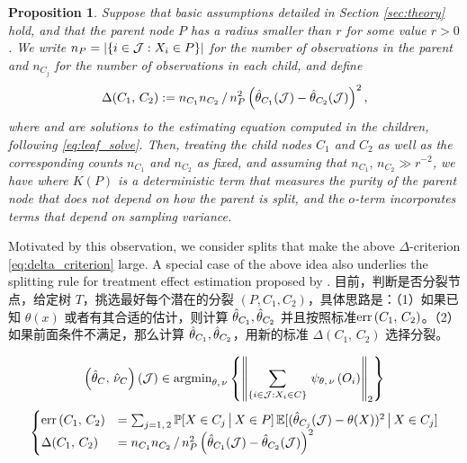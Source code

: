 \documentclass[aos]{imsart}
\theoremstyle{plain}
\newtheorem{prop}{Proposition}
\theoremstyle{definition}
\theoremstyle{remark}
\begin{document}
\begin{CJK}{UTF8}{gbsn}
\begin{prop}
\label{prop:motivation}
Suppose that basic assumptions detailed in Section \ref{sec:theory} hold,
and that the parent node $P$ has a radius smaller than
$r$ for some value $r > 0$. We write $n_P = \left\lvert\left\{i\in\mathcal{J} : X_i \in P\right\}\right\rvert$ for the number of
observations in the parent and $n_{C_j}$ for the number of observations in each child, and define
\begin{equation}
\label{eq:delta_criterion}
\Delta(C_1, \, C_2) := {n_{C_1} n_{C_2}}\,/\,{n_P^2}  \p{\htheta_{C_1}(\mathcal{J}) - \htheta_{C_2}(\mathcal{J})}^2,
\end{equation}
where  and  are solutions to the
estimating equation computed in the children, following \eqref{eq:leaf_solve}.
Then, treating the child nodes $C_1$ and $C_2$ as well as the corresponding counts $n_{C_1}$ and $n_{C_2}$
as fixed, and assuming that $n_{C_1}, \, n_{C_2} \gg r^{-2}$, we have
where $K(P)$ is a deterministic term that measures the purity of the parent node that does not depend on how the parent is split, and the $o$-term incorporates terms that depend on
sampling variance.
\end{prop}

Motivated by this observation, we consider splits that make the above $\Delta$-criterion \eqref{eq:delta_criterion} large. A special case of the above idea also underlies the splitting rule for treatment effect estimation proposed by \citet{athey2016recursive}. 目前，判断是否分裂节点，给定树 $T$，挑选最好每个潜在的分裂 $(P, C_1, C_2)$，具体思路是：（1）如果已知 $\theta(x)$ 或者有其合适的估计，则计算 $\hat{\theta}_{C_1}, \hat{\theta}_{C_2}$ 并且按照标准$\operatorname{err}\left(C_1, \, C_2\right)$。（2）如果前面条件不满足，那么计算 $\hat{\theta}_{C_1}, \hat{\theta}_{C_2}$，用新的标准 $\Delta(C_1, \, C_2)$ 选择分裂。

$$
\left(\hat{\theta}_C, \, \hat{\nu}_C\right)(\mathcal{J}) \in \operatorname{argmin}_{\theta, \, \nu} \left\{\left\lVert\sum_{\left\{i\in\mathcal{J} : X_i \in C\right\}} \, \psi_{\theta, \, \nu}\left(O_i\right)\right\rVert_2\right\} 
$$
$$
\begin{cases}
\err\p{C_1, \, C_2} &= \sum_{j = 1, \, 2}
\mathbb{P}[X \in C_j \cond X \in P] \, \mathbb{E}[(\htheta_{C_j}(\mathcal{J}) - \theta(X))^2 \cond X \in C_j] \\
\Delta(C_1, \, C_2) &= {n_{C_1} n_{C_2}}\,/\,{n_P^2}  \p{\htheta_{C_1}(\mathcal{J}) - \htheta_{C_2}(\mathcal{J})}^2 
\end{cases}
$$



\end{CJK}
\end{document}
